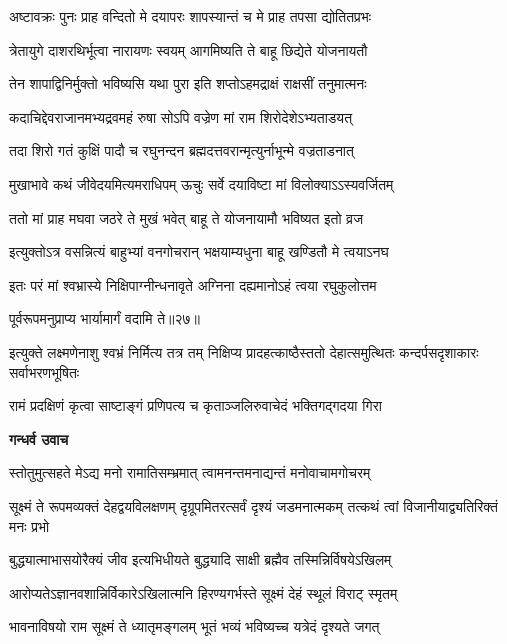 \twolineshloka
{अष्टावक्रः पुनः प्राह वन्दितो मे दयापरः}
{शापस्यान्तं च मे प्राह तपसा द्योतितप्रभः} %

\twolineshloka
{त्रेतायुगे दाशरथिर्भूत्वा नारायणः स्वयम्}
{आगमिष्यति ते बाहू छिद्येते योजनायतौ} %

\twolineshloka
{तेन शापाद्विनिर्मुक्तो भविष्यसि यथा पुरा}
{इति शप्तोऽहमद्राक्षं राक्षसीं तनुमात्मनः} %

\twolineshloka
{कदाचिद्देवराजानमभ्यद्रवमहं रुषा}
{सोऽपि वज्रेण मां राम शिरोदेशेऽभ्यताडयत्} %

\twolineshloka
{तदा शिरो गतं कुक्षिं पादौ च रघुनन्दन}
{ब्रह्मदत्तवरान्मृत्युर्नाभून्मे वज्रताडनात्} %

\twolineshloka
{मुखाभावे कथं जीवेदयमित्यमराधिपम्}
{ऊचुः सर्वे दयाविष्टा मां विलोक्याऽऽस्यवर्जितम्} %

\twolineshloka
{ततो मां प्राह मघवा जठरे ते मुखं भवेत्}
{बाहू ते योजनायामौ भविष्यत इतो व्रज} %

\twolineshloka
{इत्युक्तोऽत्र वसन्नित्यं बाहुभ्यां वनगोचरान्}
{भक्षयाम्यधुना बाहू खण्डितौ मे त्वयाऽनघ} %

\twolineshloka
{इतः परं मां श्वभ्रास्ये निक्षिपाग्नीन्धनावृते}
{अग्निना दह्यमानोऽहं त्वया रघुकुलोत्तम} %

{पूर्वरूपमनुप्राप्य भार्यामार्गं वदामि ते॥२७॥} %


\threelineshloka
{इत्युक्ते लक्ष्मणेनाशु श्वभ्रं निर्मित्य तत्र तम्}
{निक्षिप्य प्रादहत्काष्ठैस्ततो देहात्समुत्थितः}
{कन्दर्पसदृशाकारः सर्वाभरणभूषितः} %

\twolineshloka
{रामं प्रदक्षिणं कृत्वा साष्टाङ्गं प्रणिपत्य च}
{कृताञ्जलिरुवाचेदं भक्तिगद्गदया गिरा} %

\textbf{गन्धर्व उवाच}

\twolineshloka
{स्तोतुमुत्सहते मेऽद्य मनो रामातिसम्भ्रमात्}
{त्वामनन्तमनाद्यन्तं मनोवाचामगोचरम्} %

\threelineshloka
{सूक्ष्मं ते रूपमव्यक्तं देहद्वयविलक्षणम्}
{दृग्रूपमितरत्सर्वं दृश्यं जडमनात्मकम्}
{तत्कथं त्वां विजानीयाद्व्यतिरिक्तं मनः प्रभो} %

\twolineshloka
{बुद्ध्यात्माभासयोरैक्यं जीव इत्यभिधीयते}
{बुद्ध्यादि साक्षी ब्रह्मैव तस्मिन्निर्विषयेऽखिलम्} %

\twolineshloka
{आरोप्यतेऽज्ञानवशान्निर्विकारेऽखिलात्मनि}
{हिरण्यगर्भस्ते सूक्ष्मं देहं स्थूलं विराट् स्मृतम्} %

\twolineshloka
{भावनाविषयो राम सूक्ष्मं ते ध्यातृमङ्गलम्}
{भूतं भव्यं भविष्यच्च यत्रेदं दृश्यते जगत्} %

